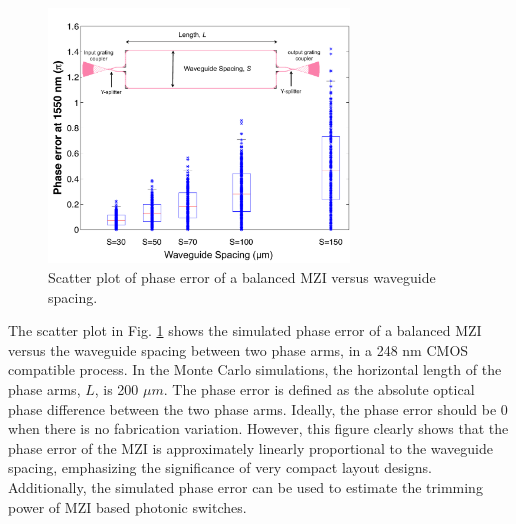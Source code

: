 \begin{figure}[t]
    \centering
    \label{error}\includegraphics[width=8cm]{error.pdf}
    \caption{Scatter plot of phase error of a balanced MZI versus waveguide spacing.} 
    \label{error}
\end{figure}


The scatter plot in Fig. \ref{error} shows the simulated phase error of a balanced MZI versus the waveguide spacing between two phase arms, in a 248 nm CMOS compatible process. In the Monte Carlo simulations, the horizontal length of the phase arms, $L$,  is 200 $\mu m$. The phase error is defined as the absolute optical phase difference between the two phase arms. Ideally, the phase error should be 0 when there is no fabrication variation. However, this figure clearly shows that the phase error of the MZI is approximately linearly proportional to the waveguide spacing, emphasizing the significance of very compact layout designs. Additionally, the simulated phase error can be used to estimate the trimming power of MZI based photonic switches. 
